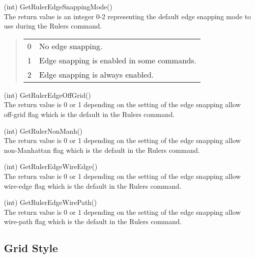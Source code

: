 \begin{description}
\item{(int) \vt GetRulerEdgeSnappingMode()}\\
The return value is an integer 0-2 representing the default edge
snapping mode to use during the {\cb Rulers} command.

\begin{quote}
\begin{tabular}{ll}
0 & No edge snapping.\\
1 & Edge snapping is enabled in some commands.\\
2 & Edge snapping is always enabled.\\
\end{tabular}
\end{quote}

\item{(int) \vt GetRulerEdgeOffGrid()}\\
The return value is 0 or 1 depending on the setting of the edge
snapping allow off-grid flag which is the default in the {\cb Rulers}
command.

\item{(int) \vt GetRulerNonManh()}\\
The return value is 0 or 1 depending on the setting of the edge
snapping allow non-Manhattan flag which is the default in the {\cb
Rulers} command.

\item{(int) \vt GetRulerEdgeWireEdge()}\\
The return value is 0 or 1 depending on the setting of the edge
snapping allow wire-edge flag which is the default in the {\cb Rulers}
command.

\item{(int) \vt GetRulerEdgeWirePath()}\\
The return value is 0 or 1 depending on the setting of the edge
snapping allow wire-path flag which is the default in the {\cb Rulers}
command.
\end{description}

\subsection{Grid Style}

